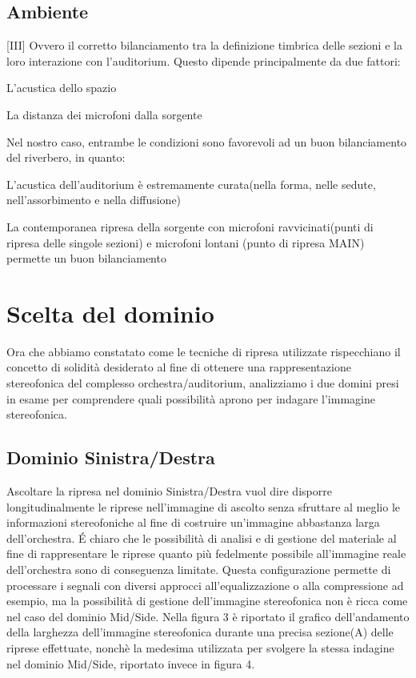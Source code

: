 	\subsection*{Ambiente}[III]
	Ovvero il corretto bilanciamento tra la definizione timbrica delle sezioni e la loro interazione con l'auditorium. Questo dipende principalmente da due fattori:
	\begin{compactitem}
		\item L'acustica dello spazio
		\item La distanza dei microfoni dalla sorgente
	\end{compactitem}
	Nel nostro caso, entrambe le condizioni sono favorevoli ad un buon bilanciamento del riverbero, in quanto:
	\begin{compactitem}
		\item L'acustica dell'auditorium è estremamente curata(nella forma, nelle sedute, nell'assorbimento e nella diffusione)
		\item La contemporanea ripresa della sorgente con microfoni ravvicinati(punti di ripresa delle singole sezioni) e microfoni lontani (punto di ripresa MAIN) permette un buon bilanciamento
	\end{compactitem}
	
	\section*{Scelta del dominio}
	Ora che abbiamo constatato come le tecniche di ripresa utilizzate rispecchiano il concetto di solidità desiderato al fine di ottenere una rappresentazione stereofonica del complesso orchestra/auditorium, analizziamo i due domini presi in esame per comprendere quali possibilità aprono per indagare l'immagine stereofonica.
	
	\subsection*{Dominio Sinistra/Destra}
	Ascoltare la ripresa nel dominio Sinistra/Destra vuol dire disporre longitudinalmente le riprese nell'immagine di ascolto senza sfruttare al meglio le informazioni stereofoniche al fine di costruire un'immagine abbastanza larga dell'orchestra.
	É chiaro che le possibilità di analisi e di gestione del materiale al fine di rappresentare le riprese quanto più fedelmente possibile all'immagine reale dell'orchestra sono di conseguenza limitate.
	Questa configurazione permette di processare i segnali con diversi approcci all'equalizzazione o alla compressione ad esempio, ma la possibilità di gestione dell'immagine stereofonica non è ricca come nel caso del dominio Mid/Side.
	Nella figura 3 è riportato il grafico dell'andamento della larghezza dell'immagine stereofonica durante una precisa sezione(A) delle riprese effettuate, nonchè la medesima utilizzata per svolgere la stessa indagine nel dominio Mid/Side, riportato invece in figura 4.
	

